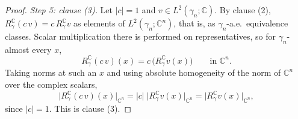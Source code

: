 \begin{proof}
\emph{Step 5: clause (3).}
Let $|c| = 1$ and $v \in L^2(\gamma_n;\mathbb{C})$.  By clause (2),
$R_\gamma^{\mathbb{C}}(c\,v) = c\,R_\gamma^{\mathbb{C}} v$ as elements of
$L^2(\gamma_n;\mathbb{C}^n)$, that is, as $\gamma_n$-a.e.\ equivalence classes.
Scalar multiplication there is performed on representatives, so for
$\gamma_n$-almost every $x$,
\[
  R_\gamma^{\mathbb{C}}(c\,v)(x) = c\,\bigl(R_\gamma^{\mathbb{C}} v(x)\bigr)
  \qquad\text{in } \mathbb{C}^n .
\]
Taking norms at such an $x$ and using absolute homogeneity of the norm of
$\mathbb{C}^n$ over the complex scalars,
\[
  \bigl|R_\gamma^{\mathbb{C}}(c\,v)(x)\bigr|_{\mathbb{C}^n}
    = |c|\;\bigl|R_\gamma^{\mathbb{C}} v(x)\bigr|_{\mathbb{C}^n}
    = \bigl|R_\gamma^{\mathbb{C}} v(x)\bigr|_{\mathbb{C}^n} ,
\]
since $|c| = 1$.  This is clause (3).
\end{proof}

